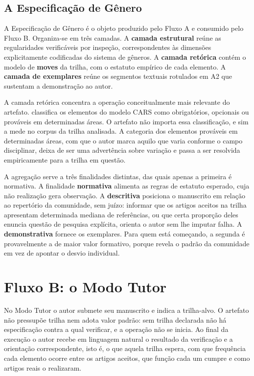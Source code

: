 \subsection{A Especificação de Gênero}
\label{sec:especificacao}

A Especificação de Gênero é o objeto produzido pelo Fluxo A e consumido pelo Fluxo B. Organiza-se em três camadas. A \textbf{camada estrutural} reúne as regularidades verificáveis por inspeção, correspondentes às dimensões explicitamente codificadas do sistema de gêneros. A \textbf{camada retórica} contém o modelo de \textbf{moves} da trilha, com o estatuto empírico de cada elemento. A \textbf{camada de exemplares} reúne os segmentos textuais rotulados em A2 que sustentam a demonstração ao autor.

A camada retórica concentra a operação conceitualmente mais relevante do artefato.  classifica os elementos do modelo CARS como obrigatórios, opcionais ou prováveis em determinadas áreas. O artefato não importa essa classificação, e sim a mede no corpus da trilha analisada. A categoria dos elementos prováveis em determinadas áreas, com que o autor marca aquilo que varia conforme o campo disciplinar, deixa de ser uma advertência sobre variação e passa a ser resolvida empiricamente para a trilha em questão.

A agregação serve a três finalidades distintas, das quais apenas a primeira é normativa. A finalidade \textbf{normativa} alimenta as regras de estatuto esperado, cuja não realização gera observação. A \textbf{descritiva} posiciona o manuscrito em relação ao repertório da comunidade, sem juízo: informar que os artigos aceitos na trilha apresentam determinada mediana de referências, ou que certa proporção deles enuncia questão de pesquisa explícita, orienta o autor sem lhe imputar falha. A \textbf{demonstrativa} fornece os exemplares. Para quem está começando, a segunda é provavelmente a de maior valor formativo, porque revela o padrão da comunidade em vez de apontar o desvio individual.


\section{Fluxo B: o Modo Tutor}
\label{sec:fluxo-b}

No Modo Tutor o autor submete seu manuscrito e indica a trilha-alvo. O artefato não pressupõe trilha nem adota valor padrão: sem trilha declarada não há especificação contra a qual verificar, e a operação não se inicia. Ao final da execução o autor recebe em linguagem natural o resultado da verificação e a orientação correspondente, isto é, o que aquela trilha espera, com que frequência cada elemento ocorre entre os artigos aceitos, que função cada um cumpre e como artigos reais o realizaram.

